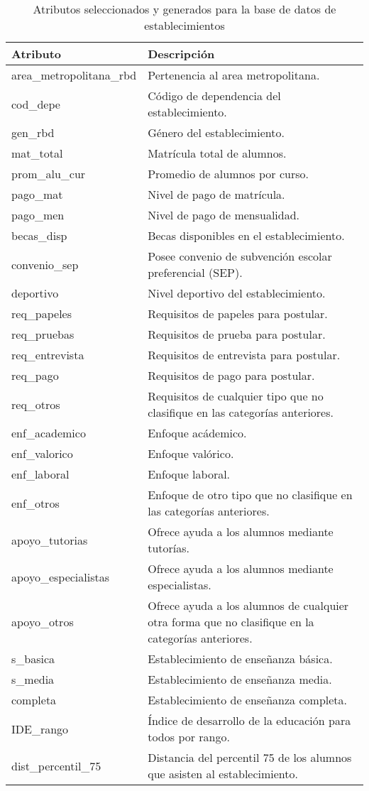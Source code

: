 \begin{table}[]
\centering
\caption{Atributos seleccionados y generados para la base de datos de establecimientos}
\label{my-label}
\begin{tabular}{|p{5cm}|p{9	cm}|}
\hline
\textbf{Atributo}  & \textbf{Descripción} \\ \hline
area\_metropolitana\_rbd & Pertenencia al area metropolitana. \\ \hline
cod\_depe & Código de dependencia del establecimiento. \\ \hline
gen\_rbd & Género del establecimiento. \\ \hline
mat\_total & Matrícula total de alumnos. \\ \hline
prom\_alu\_cur & Promedio de alumnos por curso. \\ \hline
pago\_mat & Nivel de pago de matrícula. \\ \hline
pago\_men & Nivel de pago de mensualidad. \\ \hline
becas\_disp & Becas disponibles en el establecimiento. \\ \hline
convenio\_sep & Posee convenio de subvención escolar preferencial (SEP). \\ \hline
deportivo & Nivel deportivo del establecimiento. \\ \hline
req\_papeles & Requisitos de papeles para postular. \\ \hline
req\_pruebas & Requisitos de prueba para postular. \\ \hline
req\_entrevista & Requisitos de entrevista para postular. \\ \hline
req\_pago & Requisitos de pago para postular. \\ \hline
req\_otros & Requisitos de cualquier tipo que no clasifique en las categorías anteriores. \\ \hline
enf\_academico & Enfoque acádemico. \\ \hline
enf\_valorico & Enfoque valórico. \\ \hline
enf\_laboral & Enfoque laboral. \\ \hline
enf\_otros & Enfoque de otro tipo que no clasifique en las categorías anteriores. \\ \hline
apoyo\_tutorias & Ofrece ayuda a los alumnos mediante tutorías. \\ \hline
apoyo\_especialistas & Ofrece ayuda a los alumnos mediante especialistas. \\ \hline
apoyo\_otros & Ofrece ayuda a los alumnos de cualquier otra forma que no clasifique en la categorías anteriores. \\ \hline
s\_basica & Establecimiento de enseñanza básica. \\ \hline
s\_media & Establecimiento de enseñanza media. \\ \hline
completa & Establecimiento de enseñanza completa. \\ \hline
IDE\_rango & Índice de desarrollo de la educación para todos por rango. \\ \hline
dist\_percentil\_75 & Distancia del percentil 75 de los alumnos que asisten al establecimiento. \\ \hline
\end{tabular}
\end{table}
